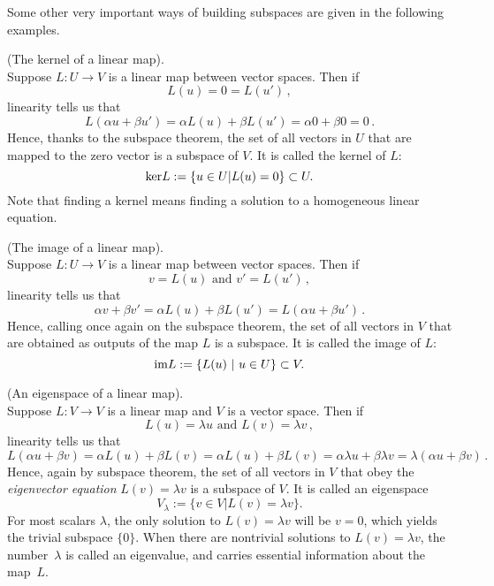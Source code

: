 
Some other very important ways of building subspaces are given in the following examples.

\begin{example}
(The kernel of a linear map).\\[-2mm]

\noindent
Suppose $L:U\to V$ is a linear map between vector spaces. Then if
\[
L(u)=0=L(u')\, ,
\]
linearity tells us that
\[
L(\alpha u + \beta u') = \alpha L(u) + \beta L(u') =\alpha 0 + \beta 0 = 0\, .
\]
Hence, thanks to the subspace theorem,  the set of all vectors in $U$ that are mapped to the zero vector is a subspace of $V$.
It is called the kernel of $L$:
\[
{\rm ker} L:=\{u\in U| L(u) = 0\}\subset U.
\]
Note that finding a kernel means finding a solution to a homogeneous linear equation. 
\end{example}

\begin{example}
(The image of a linear map).\\[-2mm]

\noindent
Suppose $L:U\to V$ is a linear map between vector spaces. Then if
\[
v=L(u) \mbox{ and } v'=L(u')\, ,
\]
linearity tells us that
\[
\alpha v + \beta v' = \alpha L(u) + \beta L(u') =L(\alpha u +\beta u')\, .
\]
Hence, calling once again on the subspace theorem,  the set of all vectors in $V$ that are obtained as outputs of the
map $L$ is a subspace.
It is called the image of $L$:
\[
{\rm im} L:=\{L(u) \ |\  u\in U \}\subset V.
\]
\end{example}

\begin{example}
(An eigenspace of a linear map).\\[-2mm]

\noindent
Suppose $L:V\to V$ is a linear map and $V$ is a vector space. Then if
\[
L(u)=\lambda u \mbox{ and } L(v)=\lambda v\, ,
\]
linearity tells us that
\[
L(\alpha u + \beta v) = \alpha L(u) + \beta L(v) =\alpha L(u) + \beta L(v) =\alpha \lambda u  + \beta \lambda v = \lambda (\alpha u + \beta v)\, .
\]
Hence, again by subspace theorem, the set of all vectors in $V$ that
obey the {\itshape eigenvector equation} $L(v)=\lambda v$ is a subspace of $V$. 
It is called an eigenspace
\[
V_\lambda:=\{v\in V| L(v) = \lambda v\}.
\]
For most scalars $\lambda$, the only solution to $L(v) = \lambda v$ will be $v=0$, which yields the trivial subspace $\{0\}$.
When there are nontrivial solutions to $L(v)=\lambda v$, the number~$\lambda$ is called an eigenvalue, and carries
essential information about the map~$L$. 
\end{example}

